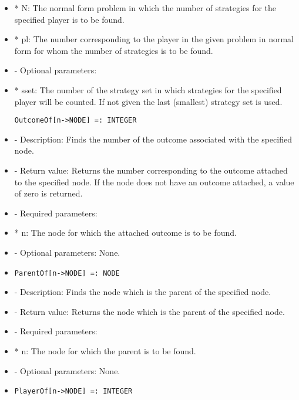 \begin{itemize}
\bd
\item
*  N:  The normal form problem in which the number of strategies for
the specified player is to be found.
\item
*  pl:  The number corresponding to the player in the given problem 
in normal form for whom the number of strategies is to be
found.
\ed

\item
- Optional parameters:
	
\bd
\item  
*  sset:  The number of the strategy set in which strategies for the
specified player will be counted.  If not given the last (smallest) 
strategy set is used.
\ed
\ed

\begin{verbatim}
OutcomeOf[n->NODE] =: INTEGER
\end{verbatim}

\bd

\item
- Description:  Finds the number of the outcome associated with the 
specified node.
\item
- Return value:  Returns the number corresponding to the outcome attached
to the specified node.  If the node does not have an outcome attached,
a value of zero is returned.
\item
- Required parameters:
	
\bd
\item
*  n:  The node for which the attached outcome is to be found.
\ed

\item
- Optional parameters:  None.

\item
\begin{verbatim}
ParentOf[n->NODE] =: NODE
\end{verbatim}

\bd
\item
- Description:  Finds the node which is the parent of the specified node.
\item
- Return value:  Returns the node which is the parent of the specified
node.
\item
- Required parameters:
	
\bd
\item
*  n:  The node for which the parent is to be found.
\ed

\item
- Optional parameters:  None.
\ed
\item
\begin{verbatim}
PlayerOf[n->NODE] =: INTEGER
\end{verbatim}


\end{itemize}
